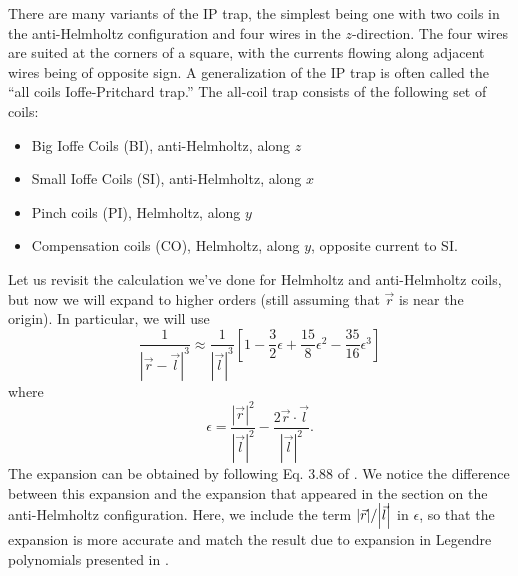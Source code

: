 \documentclass{article}
\theoremstyle{definition}
\newcommand{\f}[2]{\frac{#1}{#2}}
\newcommand{\lb}{\left[}
\newcommand{\rb}{\right]}
\begin{document}
There are many variants of the IP trap, the simplest being one with two coils in the anti-Helmholtz configuration and four wires in the $z$-direction. The four wires are suited at the corners of a square, with the currents flowing along adjacent wires being of opposite sign. A generalization of the IP trap is often called the ``all coils Ioffe-Pritchard trap.'' The all-coil trap consists of the following set of coils:
\begin{itemize}
	\item Big Ioffe Coils (BI), anti-Helmholtz, along $z$
	\item Small Ioffe Coils (SI), anti-Helmholtz, along $x$
	\item Pinch coils (PI), Helmholtz, along $y$
	\item Compensation coils (CO), Helmholtz, along $y$, opposite current to SI.
\end{itemize}

Let us revisit the calculation we've done for Helmholtz and anti-Helmholtz coils, but now we will expand to higher orders (still assuming that $\vec{r}$ is near the origin). In particular, we will use
\begin{equation*}
\f{1}{|\vec{r} - \vec{l}|^3} \approx \f{1}{|\vec{l}|^3} 
\lb 1 -\f{3}{2}\epsilon
+ \f{15}{8}\epsilon^2 
- \f{35}{16}\epsilon^3 \rb
\end{equation*}
where
\begin{equation*}
\epsilon = \f{|\vec{r}|^2}{|\vec{l}|^2} - \f{2\vec{r}\cdot\vec{l}}{|\vec{l}|^2}.
\end{equation*}
The expansion can be obtained by following 
Eq. 3.88 of \cite{griffiths2005introduction}. We notice the difference between this expansion and the expansion that appeared in the section on the anti-Helmholtz configuration. Here, we include the term $\abs{\vec{r}}/\abs{\vec{l}}$ in $\epsilon$, so that the expansion is more accurate and match the result due to expansion in Legendre polynomials presented in \cite{allcoil}.\\
\end{document}

